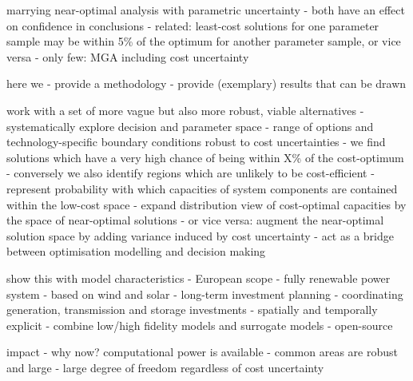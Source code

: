
marrying near-optimal analysis with parametric uncertainty
- both have an effect on confidence in conclusions
- related: least-cost solutions for one parameter sample may be within 5\% of the optimum for another parameter sample, or vice versa
- only few: MGA including cost uncertainty \cite{Trutnevyte2013,Li2017,lombardi_policy_2020}


here we
- provide a methodology
- provide (exemplary) results that can be drawn

work with a set of more vague but also more robust, viable alternatives
- systematically explore decision and parameter space
- range of options and technology-specific boundary conditions robust to cost uncertainties
- we find solutions which have a very high chance of being within X\% of the cost-optimum
- conversely we also identify regions which are unlikely to be cost-efficient
- represent probability with which capacities of system components are contained within the low-cost space
- expand distribution view of cost-optimal capacities by the space of near-optimal solutions
- or vice versa: augment the near-optimal solution space by adding variance induced by cost uncertainty
- act as a bridge between optimisation modelling and decision making

show this with model characteristics
- European scope
- fully renewable power system
- based on wind and solar
- long-term investment planning
- coordinating generation, transmission and storage investments
- spatially and temporally explicit
- combine low/high fidelity models and surrogate models
- open-source

impact
- why now? computational power is available
- common areas are robust and large
- large degree of freedom regardless of cost uncertainty